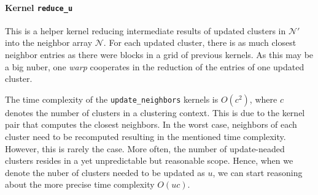 \paragraph{Kernel \texttt{reduce\_u}} This is a helper kernel reducing intermediate results of updated clusters in $\mathcal{N}'$ into the neighbor array $\mathcal{N}$. For each updated cluster, there is as much closest neighbor entries as there were blocks in a grid of previous kernels. As this may be a big nuber, one \emph{warp} cooperates in the reduction of the entries of one updated cluster.

\begin{rem}
	The time complexity of the \texttt{update\_neighbors} kernels is $O(c^2)$, where $c$ denotes the number of clusters in a clustering context. This is due to the kernel pair that computes the closest neighbors. In the worst case, neighbors of each cluster need to be recomputed resulting in the mentioned time complexity. However, this is rarely the case. More often, the number of update-neaded clusters resides in a yet unpredictable but reasonable scope. Hence, when we denote the nuber of clusters needed to be updated as $u$, we can start reasoning about the more precise time complexity $O(uc)$.
\end{rem}